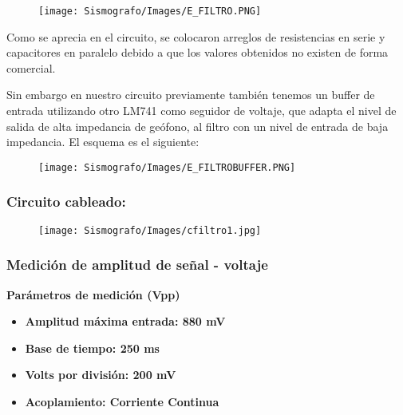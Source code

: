 \documentclass[12pt]{article}
\begin{document}
	        \begin{figure}[h!]
                \centering
                \texttt{[image: Sismografo/Images/E\_FILTRO.PNG]}
            \end{figure} 
            
            Como se aprecia en el circuito, se colocaron arreglos de resistencias en serie y capacitores en paralelo debido a que los valores obtenidos no existen de forma comercial.
	        
	        Sin embargo en nuestro circuito previamente también tenemos un buffer de entrada utilizando otro LM741 como seguidor de voltaje, que adapta el nivel de salida de alta impedancia de geófono, al filtro con un nivel de entrada de baja impedancia. 
	        \newpage
	        El esquema es el siguiente:
	        
	        \begin{figure}[h!]
                \centering
                \texttt{[image: Sismografo/Images/E\_FILTROBUFFER.PNG]}
            \end{figure} 
            
            \subsubsection{Circuito cableado:}
            \begin{figure}[h!]
                \centering
                \texttt{[image: Sismografo/Images/cfiltro1.jpg]}
            \end{figure}


	        \subsubsection{Medición de amplitud de señal - voltaje}
	       
	        \textbf{Parámetros de medición (Vpp)}
            \begin{multicols}{2}
                \begin{itemize}
                    \item[\checkmark] \textbf{Amplitud máxima entrada: 880 mV}
                    
                    \item[\checkmark] \textbf{Base de tiempo: 250 ms}
            \columnbreak
                    \item[\checkmark] \textbf{Volts por división: 200 mV}
                    \item[\checkmark] \textbf{Acoplamiento: Corriente Continua}
                \end{itemize}
            \end{multicols}
            
\end{document}
